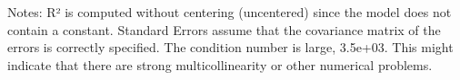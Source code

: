 \bigskip
Notes: \newline 
[1] R² is computed without centering (uncentered) since the                 model does not contain a constant. \newline 
[2] Standard Errors assume that the covariance matrix of the errors is correctly specified. \newline 
[3] The condition number is large, 3.5e+03. This might indicate                that there are strong multicollinearity or other numerical                problems.